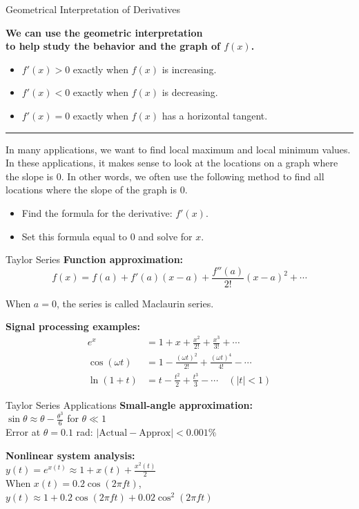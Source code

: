 \documentclass[aspectratio=169,xcolor=dvipsnames,svgnames,x11names,fleqn]{beamer}
\begin{document}
\begin{frame}{Geometrical Interpretation of Derivatives}
\begin{center}
    \bf We can use the geometric interpretation \\to help study the behavior and the graph of $f(x)$.
\end{center}
\begin{itemize}
    \item $f'(x) > 0$ exactly when $f(x)$ is increasing.
    \item $f'(x) < 0$ exactly when $f(x)$ is decreasing.
    \item $f'(x) = 0$ exactly when $f(x)$ has a horizontal tangent.
    \end{itemize}
\hrule \vspace{5pt}
\small
In many applications, we want to find local maximum and local minimum values. In these applications, it makes sense to look at the locations on a graph where the slope is $0$. In other words, we often use the following method to find all locations where
the slope of the graph is 0.
\begin{itemize}
    \item Find the formula for the derivative: $f'(x)$.
    \item Set this formula equal to $0$ and solve for $x$.
\end{itemize}
\end{frame}



\begin{frame}{Taylor Series}
\textbf{Function approximation:}
\[
f(x) = f(a) + f'(a)(x-a) + \frac{f''(a)}{2!}(x-a)^2 + \cdots
\]

When $a = 0$, the series is called Maclaurin series.

\textbf{Signal processing examples:}
\begin{align*}
e^x &= 1 + x + \frac{x^2}{2!} + \frac{x^3}{3!} + \cdots \\
\cos(\omega t) &= 1 - \frac{(\omega t)^2}{2!} + \frac{(\omega t)^4}{4!} - \cdots \\
\ln(1+t) &= t - \frac{t^2}{2} + \frac{t^3}{3} - \cdots \quad (|t|<1)
\end{align*}


\end{frame}


\begin{frame}{Taylor Series Applications}
\textbf{Small-angle approximation:} \\
$\sin\theta \approx \theta - \frac{\theta^3}{6}$ for $\theta \ll 1$ \\
Error at $\theta=0.1$ rad: $| \text{Actual} - \text{Approx} | < 0.001\%$

\vspace{20pt}

\textbf{Nonlinear system analysis:} \\
$y(t) = e^{x(t)} \approx 1 + x(t) + \frac{x^2(t)}{2}$ \\
When $x(t) = 0.2\cos(2\pi f t)$, \\
$y(t) \approx 1 + 0.2\cos(2\pi f t) + 0.02\cos^2(2\pi f t)$
\end{frame}
\end{document}
